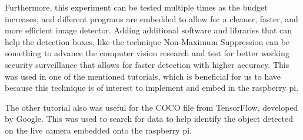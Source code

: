 Furthermore, this experiment can be tested multiple times as the budget increases, and different programs are embedded to allow for a cleaner, faster, and more efficient image detector. Adding additional software and libraries that can help the detection boxes, like the technique Non-Maximum Suppression can be something to advance the computer vision research and test for better working security surveillance that allows for faster detection with higher accuracy. This was used in one of the mentioned tutorials, which is beneficial for us to have because this technique is of interest to implement and embed in the raspberry pi.

The other tutorial also was useful for the COCO file from TensorFlow, developed by Google. This was used to search for data to help identify the object detected on the live camera embedded onto the raspberry pi.

